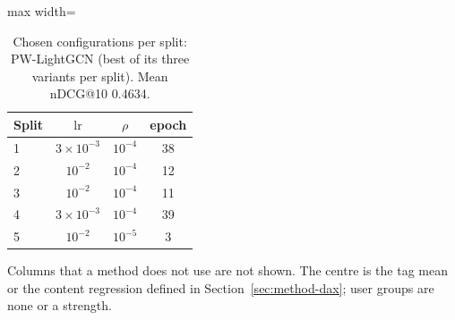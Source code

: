 \begin{table}[tbp]
\centering
\footnotesize
\caption{Chosen configurations per split: PW-LightGCN (best of its three variants per split). Mean nDCG@10 0.4634.}
\label{tab:grid02}
\begin{adjustbox}{max width=\linewidth}
\begin{tabular}{lccc}
\toprule
Split & $\mathrm{lr}$ & $\rho$ & epoch \\
\midrule
1 & $3\times10^{-3}$ & $10^{-4}$ & 38 \\
2 & $10^{-2}$ & $10^{-4}$ & 12 \\
3 & $10^{-2}$ & $10^{-4}$ & 11 \\
4 & $3\times10^{-3}$ & $10^{-4}$ & 39 \\
5 & $10^{-2}$ & $10^{-5}$ & 3 \\
\bottomrule
\end{tabular}
\end{adjustbox}
\par\smallskip
\begin{minipage}{\linewidth}\raggedright\footnotesize Columns that a method does not use are not shown. The centre is the tag mean or the content regression defined in Section~\ref{sec:method-dax}; user groups are none or a strength.\end{minipage}
\end{table}
